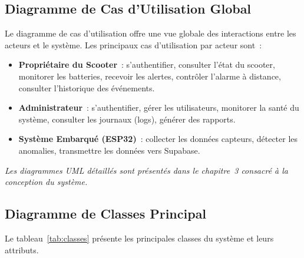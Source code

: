 \documentclass[12pt, a4paper]{report}
\begin{document}
\subsection{Diagramme de Cas d'Utilisation Global}

Le diagramme de cas d'utilisation offre une vue globale des interactions entre les
acteurs et le système. Les principaux cas d'utilisation par acteur sont~:

\begin{itemize}
  \item \textbf{Propriétaire du Scooter}~: s'authentifier, consulter l'état du scooter,
        monitorer les batteries, recevoir les alertes, contrôler l'alarme à distance,
        consulter l'historique des événements.
  \item \textbf{Administrateur}~: s'authentifier, gérer les utilisateurs, monitorer
        la santé du système, consulter les journaux (logs), générer des rapports.
  \item \textbf{Système Embarqué (ESP32)}~: collecter les données capteurs, détecter
        les anomalies, transmettre les données vers Supabase.
\end{itemize}

\textit{Les diagrammes UML détaillés sont présentés dans le chapitre~3 consacré à la
conception du système.}

\subsection{Diagramme de Classes Principal}

Le tableau~\ref{tab:classes} présente les principales classes du système et leurs
attributs.
\end{document}
